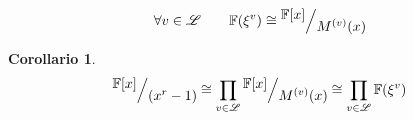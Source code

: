\documentclass[mathserif]{beamer}
\def\quotient#1#2{%
   \raise1ex\hbox{$#1$}\Big/\lower1ex\hbox{$#2$}%
}
\newtheorem{corollario}{Corollario}
\begin{document}
\begin{frame}
   \begin{lemma}
   \begin{align*}
      \forall v \in \mathscr{L}
      \qquad
      \mathbb{F}(\xi^{v})
      \cong
      \quotient{\mathbb{F} \lbrack x \rbrack  }{M^{(v)}(x)}
   \end{align*}
  \end{lemma}
  \begin{corollario}
     \begin{align*}
        \quotient{\mathbb{F} \lbrack x \rbrack  }{ (x^{r} - 1)}
         \cong
         \prod_{v\in \mathscr{L}} \quotient{\mathbb{F} \lbrack x \rbrack  }{M^{(v)}(x)}
         \cong
         \prod_{v\in \mathscr{L}} \mathbb{F}(\xi^{v})
     \end{align*}
  \end{corollario}

\end{frame}


\end{document}
